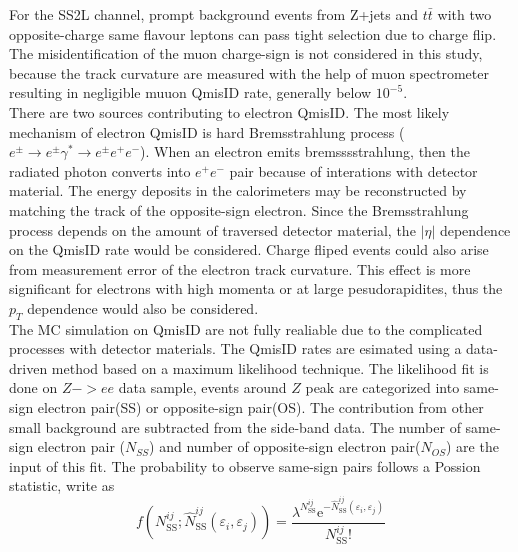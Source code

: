 For the SS2L channel, prompt background events from Z+jets and $t\bar{t}$ with two opposite-charge same flavour leptons can pass tight selection due to charge flip. The misidentification of the muon charge-sign is not considered in this study, because the track curvature are measured with the help of muon spectrometer resulting in negligible muuon QmisID rate, generally below $10^{-5}$.\\
There are two sources contributing to electron QmisID. The most likely mechanism of electron QmisID is hard Bremsstrahlung process ($e^{\pm} \rightarrow e^{\pm} \gamma^{*} \rightarrow e^{\pm} e^{+} e^{-}$). When an electron emits bremsssstrahlung, then the radiated photon converts into $e^+e^-$ pair because of interations with detector material. The energy deposits in the calorimeters may be reconstructed by matching the track of the opposite-sign electron. Since the Bremsstrahlung process depends on the amount of traversed detector material, the $|\eta|$ dependence on the QmisID rate would be considered. Charge fliped events could also arise from measurement error of the electron track curvature. This effect is more significant for electrons with high momenta or at large pesudorapidites, thus the $p_T$ dependence would also be considered.\\
The MC simulation on QmisID are not fully realiable due to the complicated processes with detector materials. The QmisID rates  are esimated using a data-driven method based on a maximum likelihood technique. The likelihood fit is done on $Z ->ee$ data sample, events around $Z$ peak are categorized into same-sign electron pair(SS) or opposite-sign pair(OS). The contribution from other small background are subtracted from the side-band data. The number of same-sign electron pair ($N_{SS}$) and number of opposite-sign electron pair($N_{OS}$) are the input of this fit. The probability to observe same-sign pairs follows a Possion statistic, write as 
\begin{equation}
f\left(N_{\mathrm{SS}}^{i j} ; \hat{N}_{\mathrm{SS}}^{i j}\left(\varepsilon_{i}, \varepsilon_{j}\right)\right)=\frac{\lambda^{N_{\mathrm{SS}}^{i j}} \mathrm{e}^{-\hat{N}_{\mathrm{SS}}^{i j}\left(\varepsilon_{i}, \varepsilon_{j}\right)}}{N_{\mathrm{SS}}^{i j} !}
\end{equation}

